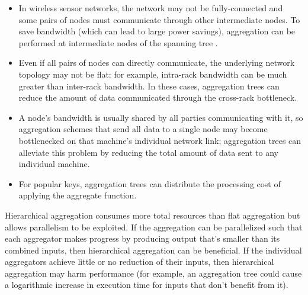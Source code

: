 \documentclass[twocolumn, 10pt]{article}
\begin{document}
\begin{itemize}
    \item In wireless sensor networks, the network may not be fully-connected
    and some pairs of nodes must communicate through other intermediate nodes.
    To save bandwidth (which can lead to large power savings), aggregation can
    be performed at intermediate nodes of the spanning tree \cite{tag}.

    \item Even if all pairs of nodes can directly communicate, the underlying
    network topology may not be flat: for example, intra-rack bandwidth can be
    much greater than inter-rack bandwidth.  In these cases, aggregation trees
    can reduce the amount of data communicated through the cross-rack
    bottleneck.

    \item A node's bandwidth is usually shared by all parties communicating
    with it, so aggregation schemes that send all data to a single node may
    become bottlenecked on that machine's individual network link; aggregation
    trees can alleviate this problem by reducing the total amount of data sent
    to any individual machine.

    \item For popular keys, aggregation trees can distribute the processing
    cost of applying the aggregate function.

\end{itemize}

Hierarchical aggregation consumes more total resources than flat aggregation
but allows parallelism to be exploited.  If the aggregation can be parallelized
such that each aggregator makes progress by producing output that's smaller
than its combined inputs, then hierarchical aggregation can be beneficial.
If the individual aggregators achieve little or no reduction of their inputs,
then hierarchical aggregation may harm performance (for example, an
aggregation tree could cause a logarithmic increase in execution time for
inputs that don't benefit from it).


\end{document}
